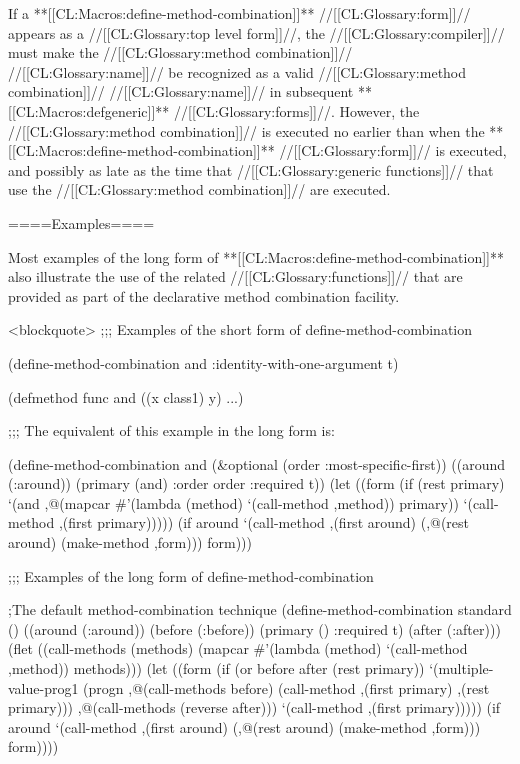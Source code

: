 \endlist

If a **[[CL:Macros:define-method-combination]]** //[[CL:Glossary:form]]// appears as a //[[CL:Glossary:top level form]]//, the //[[CL:Glossary:compiler]]// must make the //[[CL:Glossary:method combination]]// //[[CL:Glossary:name]]// be recognized as a valid //[[CL:Glossary:method combination]]// //[[CL:Glossary:name]]// in subsequent **[[CL:Macros:defgeneric]]** //[[CL:Glossary:forms]]//. However, the //[[CL:Glossary:method combination]]// is executed no earlier than when the **[[CL:Macros:define-method-combination]]** //[[CL:Glossary:form]]// is executed, and possibly as late as the time that //[[CL:Glossary:generic functions]]// that use the //[[CL:Glossary:method combination]]// are executed.

====Examples====


Most examples of the long form of **[[CL:Macros:define-method-combination]]** also illustrate the use of the related //[[CL:Glossary:functions]]// that are provided as part of the declarative method combination facility.

<blockquote> ;;; Examples of the short form of define-method-combination

(define-method-combination and :identity-with-one-argument t)

(defmethod func and ((x class1) y) ...)

;;; The equivalent of this example in the long form is:

(define-method-combination and (&optional (order :most-specific-first)) ((around (:around)) (primary (and) :order order :required t)) (let ((form (if (rest primary) `(and ,@(mapcar #'(lambda (method) `(call-method ,method)) primary)) `(call-method ,(first primary))))) (if around `(call-method ,(first around) (,@(rest around) (make-method ,form))) form)))

;;; Examples of the long form of define-method-combination

;The default method-combination technique (define-method-combination standard () ((around (:around)) (before (:before)) (primary () :required t) (after (:after))) (flet ((call-methods (methods) (mapcar #'(lambda (method) `(call-method ,method)) methods))) (let ((form (if (or before after (rest primary)) `(multiple-value-prog1 (progn ,@(call-methods before) (call-method ,(first primary) ,(rest primary))) ,@(call-methods (reverse after))) `(call-method ,(first primary))))) (if around `(call-method ,(first around) (,@(rest around) (make-method ,form))) form))))

